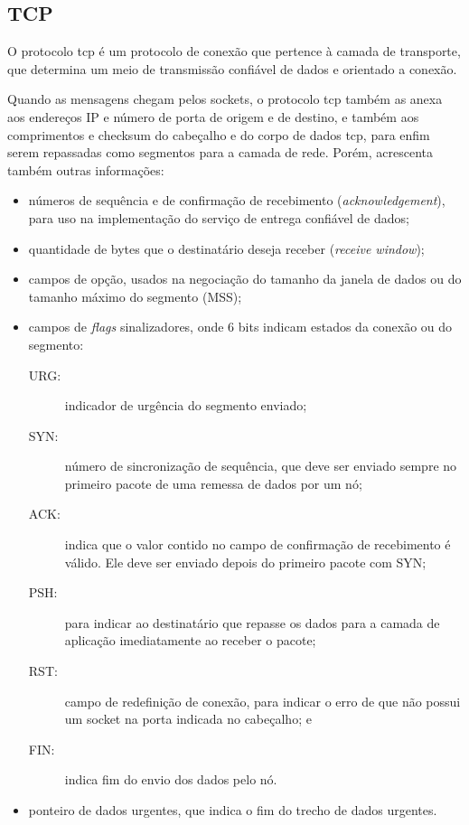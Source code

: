 
\subsection*{TCP}

O protocolo \gls*{tcp} é um protocolo de conexão que pertence à camada de transporte,
que determina um meio de transmissão confiável de dados e orientado a conexão.

Quando as mensagens chegam pelos \glspl*{socket}, o protocolo \gls*{tcp} também as anexa
aos endereços IP e número de porta de origem e de destino, e também aos comprimentos e
\gls*{checksum} do cabeçalho e do corpo de dados \gls*{tcp}, para enfim serem repassadas
como segmentos para a camada de rede. Porém, acrescenta também outras informações:

\begin{itemize}
    \item números de sequência e de confirmação de recebimento (\emph{acknowledgement}),
        para uso na implementação do serviço de entrega confiável de dados;

    \item quantidade de bytes que o destinatário deseja receber (\emph{receive window});

    \item campos de opção, usados na negociação do tamanho da janela de dados ou do
        tamanho máximo do segmento (MSS);

    \item campos de \emph{flags} sinalizadores, onde 6 bits indicam estados da conexão
        ou do segmento:
        \begin{description}
            \item[URG:] indicador de urgência do segmento enviado;

            \item[SYN:] número de sincronização de sequência, que deve ser enviado
                sempre no primeiro pacote de uma remessa de dados por um nó;

            \item[ACK:] indica que o valor contido no campo de confirmação de
                recebimento é válido. Ele deve ser enviado depois do primeiro pacote com
                SYN;

            \item[PSH:] para indicar ao destinatário que repasse os dados para a camada
                de aplicação imediatamente ao receber o pacote;

            \item[RST:] campo de redefinição de conexão, para indicar o erro de que não
                possui um \gls*{socket} na porta indicada no cabeçalho; e

            \item[FIN:] indica fim do envio dos dados pelo nó.
        \end{description}

    \item ponteiro de dados urgentes, que indica o fim do trecho de dados urgentes.
\end{itemize}

